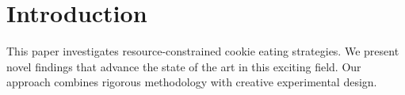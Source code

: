 \section{Introduction}

This paper investigates resource-constrained cookie eating strategies. We present novel findings that advance the state of the art in this exciting field. Our approach combines rigorous methodology with creative experimental design.
